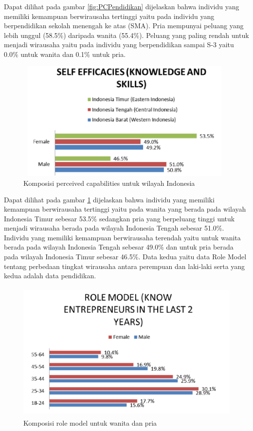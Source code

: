 \documentclass[a4paper,twoside]{article}
\begin{document}
\begin{enumerate}
Dapat dilihat pada gambar \ref{fig:PCPendidikan} dijelaskan bahwa individu yang memiliki kemampuan berwirausaha tertinggi yaitu pada individu yang berpendidikan sekolah menengah ke atas (SMA). Pria mempunyai peluang yang lebih unggul (58.5\%) daripada wanita (55.4\%). Peluang yang paling rendah untuk menjadi wirausaha yaitu pada individu yang berpendidikan sampai S-3 yaitu 0.0\% untuk wanita dan 0.1\% untuk pria. 

\begin{figure} [H]
	\centering  
	\includegraphics[width=11cm, height=6cm]{PCRegion} 
	\caption[Komposisi perceived capabilities untuk wilayah Indonesia]{Komposisi perceived capabilities untuk wilayah Indonesia} 
	\label{fig:PCRegion} 
\end{figure}

Dapat dilihat pada gambar \ref{fig:PCRegion} dijelaskan bahwa individu yang memiliki kemampuan berwirausaha tertinggi yaitu pada wanita yang berada pada wilayah Indonesia Timur sebesar 53.5\% sedangkan pria yang berpeluang tinggi untuk menjadi wirausaha berada pada wilayah Indonesia Tengah sebesar 51.0\%. Individu yang memiliki kemampuan berwirausaha terendah yaitu untuk wanita berada pada wilayah Indonesia Tengah sebesar 49.0\% dan untuk pria berada pada wilayah Indonesia Timur sebesar 46.5\%. Data kedua yaitu data Role Model tentang perbedaan tingkat wirausaha antara perempuan dan laki-laki serta yang kedua adalah data pendidikan.

\begin{figure} [H]
	\centering  
	\includegraphics[width=12cm, height=7cm]{RMfemalemale} 
	\caption[Komposisi role model untuk wanita dan pria]{Komposisi role model untuk wanita dan pria} 
	\label{fig:RMfemalemale} 
\end{figure}



\end{enumerate}
\end{document}
